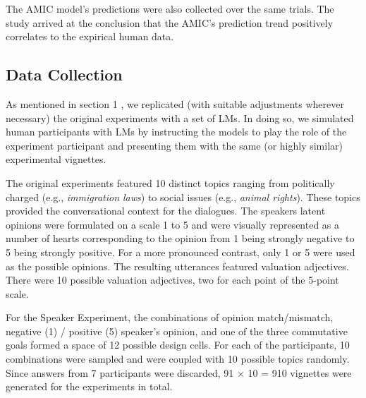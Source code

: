 \documentclass[11pt]{article}
\begin{document}
The AMIC model’s predictions were also collected over the same trials. The study arrived at the conclusion that the AMIC's prediction trend positively correlates to the expirical human data.



\subsection{Data Collection}
\label{sec:data}

As mentioned in section 1 , we replicated (with suitable adjustments wherever necessary) the original experiments with a set of LMs. In doing so, we simulated human participants with LMs by instructing the models to play the role of the experiment participant and presenting them with the same (or highly similar) experimental vignettes.

The original experiments featured 10 distinct topics ranging from politically charged (e.g., \textit{immigration laws}) to social issues (e.g., \textit{animal rights}). These topics provided the conversational context for the dialogues. The speakers latent opinions were formulated on a scale 1 to 5 and were visually represented as a number of hearts corresponding to the opinion from 1 being strongly negative to 5 being strongly positive. For a more pronounced contrast, only 1 or 5 were used as the possible opinions. The resulting utterances featured valuation adjectives. There were 10 possible valuation adjectives, two for each point of the 5-point scale.

For the Speaker Experiment, the combinations of opinion match/mismatch, negative (1) / positive (5) speaker's opinion, and one of the three commutative goals formed a space of 12 possible design cells. For each of the participants, 10 combinations were sampled and were coupled with 10 possible topics randomly. Since answers from 7 participants were discarded, 91 $\times$ 10 = 910 vignettes were generated for the experiments in total.
\end{document}
